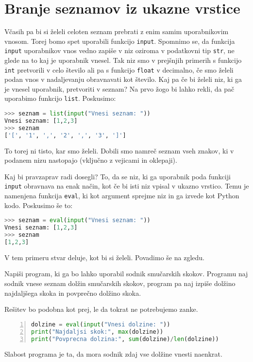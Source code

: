 \section{Branje seznamov iz ukazne vrstice}
Včasih pa bi si želeli celoten seznam prebrati z enim samim uporabnikovim vnosom. Torej bomo spet uporabili funkcijo \texttt{input}. Spomnimo se, da funkcija \texttt{input} uporabnikov vnos vedno zapiše v niz oziroma v podatkovni tip \texttt{str}, ne glede na to kaj je uporabnik vnesel. Tak niz smo v prejšnjih primerih s funkcijo \texttt{int} pretvorili v celo število ali pa s funkcijo \texttt{float} v decimalno, če smo želeli podan vnos v nadaljevanju obravnavati kot število. Kaj pa če bi želeli niz, ki ga je vnesel uporabnik, pretvoriti v seznam? Na prvo žogo bi lahko rekli, da pač uporabimo funkcijo \texttt{list}. Poskusimo:
\begin{lstlisting}[language=Python]
>>> seznam = list(input("Vnesi seznam: "))
Vnesi seznam: [1,2,3]
>>> seznam
['[', '1', ',', '2', ',', '3', ']']
\end{lstlisting}
To torej ni tisto, kar smo želeli. Dobili smo namreč seznam vseh znakov, ki v podanem nizu nastopajo (vključno z vejicami in oklepaji).

Kaj bi pravzaprav radi dosegli? To, da se niz, ki ga uporabnik poda funkciji \texttt{input} obravnava na enak način, kot če bi isti niz vpisal v ukazno vrstico. Temu je namenjena funkcija \texttt{eval}, ki kot argument sprejme niz in ga izvede kot Python kodo. Poskusimo še to:
\begin{lstlisting}[language=Python]
>>> seznam = eval(input("Vnesi seznam: "))
Vnesi seznam: [1,2,3]
>>> seznam
[1,2,3]
\end{lstlisting}
V tem primeru stvar deluje, kot bi si želeli. Povadimo še na zgledu.

\begin{zgled}
Napiši program, ki ga bo lahko uporabil sodnik smučarskih skokov. Programu naj sodnik vnese seznam dolžin smučarskih skokov, program pa naj izpiše dolžino najdaljšega skoka in povprečno dolžino skoka.
\end{zgled}
\begin{resitev}
Rešitev bo podobna kot prej, le da tokrat ne potrebujemo zanke.
\begin{lstlisting}[language=Python,numbers=left]
dolzine = eval(input("Vnesi dolzine: "))
print("Najdaljsi skok:", max(dolzine))
print("Povprecna dolzina:", sum(dolzine)/len(dolzine))
\end{lstlisting}
Slabost programa je ta, da mora sodnik zdaj vse dolžine vnesti naenkrat. 
\end{resitev}

